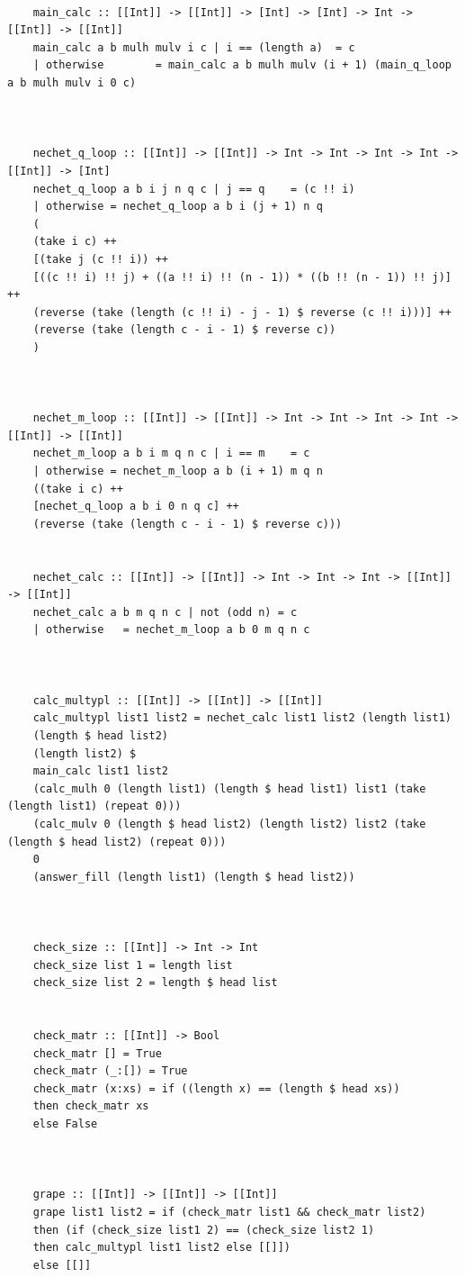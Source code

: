 \documentclass[12pt]{report}
\begin{document}
\begin{lstlisting}[label=some-code2,caption=Алгоритм Виноградова]
	
	main_calc :: [[Int]] -> [[Int]] -> [Int] -> [Int] -> Int -> [[Int]] -> [[Int]]
	main_calc a b mulh mulv i c | i == (length a)  = c
	| otherwise        = main_calc a b mulh mulv (i + 1) (main_q_loop a b mulh mulv i 0 c)
	
	
	
	nechet_q_loop :: [[Int]] -> [[Int]] -> Int -> Int -> Int -> Int -> [[Int]] -> [Int]
	nechet_q_loop a b i j n q c | j == q    = (c !! i)
	| otherwise = nechet_q_loop a b i (j + 1) n q 
	(
	(take i c) ++ 
	[(take j (c !! i)) ++
	[((c !! i) !! j) + ((a !! i) !! (n - 1)) * ((b !! (n - 1)) !! j)] ++ 
	(reverse (take (length (c !! i) - j - 1) $ reverse (c !! i)))] ++
	(reverse (take (length c - i - 1) $ reverse c))
	)
	
	
	
	nechet_m_loop :: [[Int]] -> [[Int]] -> Int -> Int -> Int -> Int -> [[Int]] -> [[Int]]
	nechet_m_loop a b i m q n c | i == m    = c
	| otherwise = nechet_m_loop a b (i + 1) m q n
	((take i c) ++
	[nechet_q_loop a b i 0 n q c] ++
	(reverse (take (length c - i - 1) $ reverse c)))
	
	
	nechet_calc :: [[Int]] -> [[Int]] -> Int -> Int -> Int -> [[Int]] -> [[Int]]
	nechet_calc a b m q n c | not (odd n) = c
	| otherwise   = nechet_m_loop a b 0 m q n c
	
	
	
	calc_multypl :: [[Int]] -> [[Int]] -> [[Int]]
	calc_multypl list1 list2 = nechet_calc list1 list2 (length list1)
	(length $ head list2)
	(length list2) $ 
	main_calc list1 list2 
	(calc_mulh 0 (length list1) (length $ head list1) list1 (take (length list1) (repeat 0)))
	(calc_mulv 0 (length $ head list2) (length list2) list2 (take (length $ head list2) (repeat 0)))
	0
	(answer_fill (length list1) (length $ head list2))
	
	
	
	check_size :: [[Int]] -> Int -> Int
	check_size list 1 = length list
	check_size list 2 = length $ head list
	
	
	check_matr :: [[Int]] -> Bool
	check_matr [] = True
	check_matr (_:[]) = True
	check_matr (x:xs) = if ((length x) == (length $ head xs))
	then check_matr xs
	else False
	


	grape :: [[Int]] -> [[Int]] -> [[Int]]
	grape list1 list2 = if (check_matr list1 && check_matr list2) 
	then (if (check_size list1 2) == (check_size list2 1)
	then calc_multypl list1 list2 else [[]])
	else [[]]
	\end{lstlisting}
	
\end{document}
